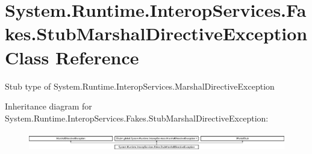 \hypertarget{class_system_1_1_runtime_1_1_interop_services_1_1_fakes_1_1_stub_marshal_directive_exception}{\section{System.\-Runtime.\-Interop\-Services.\-Fakes.\-Stub\-Marshal\-Directive\-Exception Class Reference}
\label{class_system_1_1_runtime_1_1_interop_services_1_1_fakes_1_1_stub_marshal_directive_exception}
}


Stub type of System.\-Runtime.\-Interop\-Services.\-Marshal\-Directive\-Exception 


Inheritance diagram for System.\-Runtime.\-Interop\-Services.\-Fakes.\-Stub\-Marshal\-Directive\-Exception\-:\begin{figure}[H]
\begin{center}
\leavevmode
\includegraphics[height=0.835198cm]{class_system_1_1_runtime_1_1_interop_services_1_1_fakes_1_1_stub_marshal_directive_exception}
\end{center}
\end{figure}
